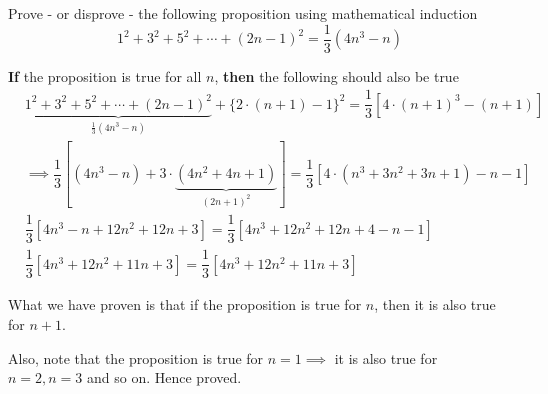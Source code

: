 
\question[3] Prove - or disprove - the following proposition using mathematical induction
\[ 1^2 + 3^2 + 5^2 + \cdots + (2n-1)^2 = \dfrac{1}{3}(4n^3-n) \]

\insertQR{}

\begin{solution}[\halfpage]
  \textbf{If} the proposition is true for all $n$, \textbf{then} the following should also 
  be true
  \begin{align}
    &\underbrace{1^2+3^2+5^2+\cdots+(2n-1)^2}_{\frac{1}{3}(4n^3-n)} +
    \lbrace 2\cdot(n+1)-1\rbrace^2 = \dfrac{1}{3}\left[4\cdot(n+1)^3-(n+1) \right] \\
    &\implies \dfrac{1}{3}\left[ (4n^3-n) + 3\cdot\underbrace{(4n^2+4n+1)}_{(2n+1)^2} \right] = 
    \dfrac{1}{3}\left[ 4\cdot (n^3+3n^2+3n+1) - n - 1\right] \\
    &\dfrac{1}{3}\left[ 4n^3-n +12n^2+12n+3\right] =
    \dfrac{1}{3}\left[ 4n^3 + 12n^2 + 12n + 4 -n - 1\right] \\
    &\dfrac{1}{3}\left[ 4n^3+12n^2+11n + 3\right] = \dfrac{1}{3}\left[ 4n^3 + 12n^2 +11n + 3\right]
  \end{align}

  What we have proven is that if the proposition is true for $n$, then it is also 
  true for $n+1$. 

  Also, note that the proposition is true for $n=1\implies$ it is also true for $n=2, n=3$ 
  and so on. Hence proved.
\end{solution}


